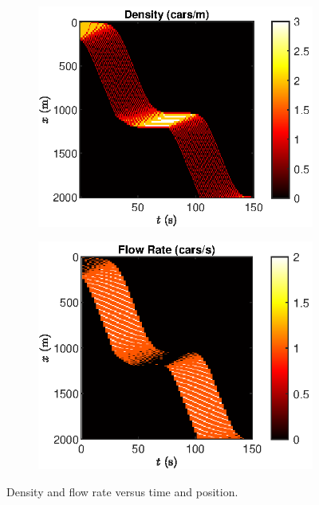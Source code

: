 \documentclass[12pt]{article}
\begin{document}

  \begin{figure}[H]
    \centering
  \begin{subfigure}[H]{.49\textwidth}
    \includegraphics[width=\linewidth]{BottleNeck5.eps}
    \centering
  \end{subfigure}
  \begin{subfigure}[H]{.49\textwidth}
    \includegraphics[width=\linewidth]{BottleNeck6.eps}
    \centering
  \end{subfigure}
  \caption{Density and flow rate versus time and position.}
  \label{fig:obstacleDensity}
  \end{figure}
\end{document}
